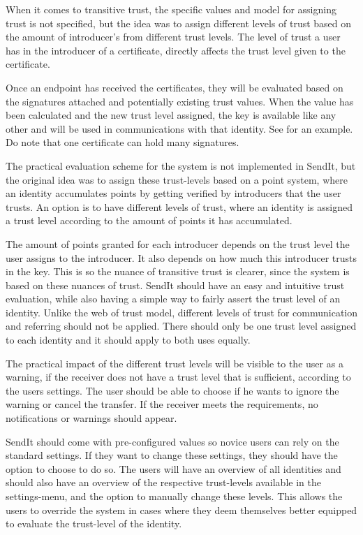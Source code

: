 		When it comes to transitive trust, the specific values and model for assigning trust is not specified, but the idea was to assign different levels of trust based on the amount of introducer's from different trust levels. The level of trust a user has in the introducer of a certificate, directly affects the trust level given to the certificate.

		Once an endpoint has received the certificates, they will be evaluated based on the signatures attached and potentially existing trust values. When the value has been calculated and the new trust level assigned, the key is available like any other and will be used in communications with that identity. See  for an example. Do note that one certificate can hold many signatures.

		The practical evaluation scheme for the system is not implemented in SendIt, but the original idea was to assign these trust-levels based on a point system, where an identity accumulates points by getting verified by introducers that the user trusts. An option is to have different levels of trust, where an identity is assigned a trust level according to the amount of points it has accumulated.

		The amount of points granted for each introducer depends on the trust level the user assigns to the introducer. It also depends on how much this introducer trusts in the key. This is so the nuance of transitive trust is clearer, since the system is based on these nuances of trust. SendIt should have an easy and intuitive trust evaluation, while also having a simple way to fairly assert the trust level of an identity. Unlike the web of trust model, different levels of trust for communication and referring should not be applied. There should only be one trust level assigned to each identity and it should apply to both uses equally.

		The practical impact of the different trust levels will be visible to the user as a warning, if the receiver does not have a trust level that is sufficient, according to the users settings. The user should be able to choose if he wants to ignore the warning or cancel the transfer. If the receiver meets the requirements, no notifications or warnings should appear.

		SendIt should come with pre-configured values so novice users can rely on the standard settings. If they want to change these settings, they should have the option to choose to do so. The users will have an overview of all identities and should also have an overview of the respective trust-levels available in the settings-menu, and the option to manually change these levels. This allows the users to override the system in cases where they deem themselves better equipped to evaluate the trust-level of the identity.

